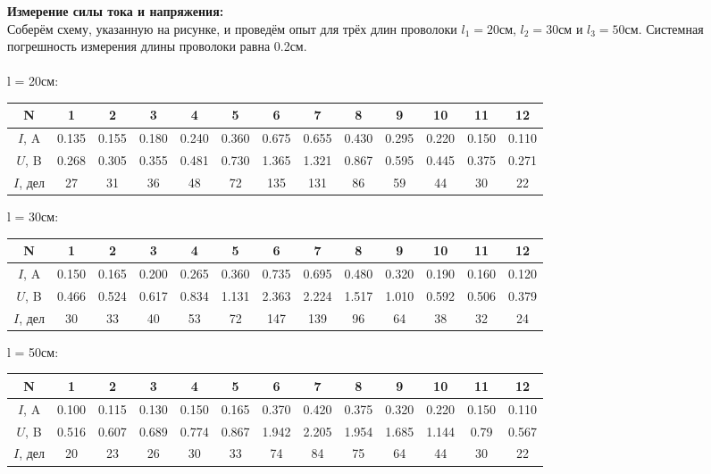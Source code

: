 \documentclass[12pt, a4paper]{article}
\begin{document}
    \textbf{Измерение силы тока и напряжения:} \\
    Соберём схему, указанную на рисунке, и проведём опыт для трёх длин проволоки $l_1 = 20$см, $l_2 = 30$см и $l_3 = 50$см. Системная погрешность измерения длины проволоки равна 0.2см. \\
    \\ l = 20см:
    \begin{center}
        \begin{tabular}{ |c|c|c|c|c|c|c|c|c|c|c|c|c| } \hline
            N & 1 & 2 & 3 & 4 & 5 & 6 & 7 & 8 & 9 & 10 & 11 & 12 \\ \hline
            $I$, A & 0.135 & 0.155 & 0.180 & 0.240 & 0.360 & 0.675 & 0.655 & 0.430 & 0.295 & 0.220 & 0.150 & 0.110 \\ \hline
            $U$, B & 0.268 & 0.305 & 0.355 & 0.481 & 0.730 & 1.365 & 1.321 & 0.867 & 0.595 & 0.445 & 0.375 & 0.271 \\ \hline
            $I$, дел & 27 & 31 & 36 & 48 & 72 & 135 & 131 & 86 & 59 & 44 & 30 & 22 \\ \hline
        \end{tabular}
        \end{center}
    l = 30см:
    \begin{center}
        \begin{tabular}{ |c|c|c|c|c|c|c|c|c|c|c|c|c| } \hline
            N & 1 & 2 & 3 & 4 & 5 & 6 & 7 & 8 & 9 & 10 & 11 & 12 \\ \hline
            $I$, A & 0.150 & 0.165 & 0.200 & 0.265 & 0.360 & 0.735 & 0.695 & 0.480 & 0.320 & 0.190 & 0.160 & 0.120 \\ \hline
            $U$, B & 0.466 & 0.524 & 0.617 & 0.834 & 1.131 & 2.363 & 2.224 & 1.517 & 1.010 & 0.592 & 0.506 & 0.379 \\ \hline
            $I$, дел & 30 & 33 & 40 & 53 & 72 & 147 & 139 & 96 & 64 & 38 & 32 & 24 \\ \hline
        \end{tabular}
        \end{center}
    l = 50см:
    \begin{center}
        \begin{tabular}{ |c|c|c|c|c|c|c|c|c|c|c|c|c| } \hline
            N & 1 & 2 & 3 & 4 & 5 & 6 & 7 & 8 & 9 & 10 & 11 & 12 \\ \hline
            $I$, A & 0.100 & 0.115 & 0.130 & 0.150 & 0.165 & 0.370 & 0.420 & 0.375 & 0.320 & 0.220 & 0.150 & 0.110 \\ \hline
            $U$, B & 0.516 & 0.607 & 0.689 & 0.774 & 0.867 & 1.942 & 2.205 & 1.954 & 1.685 & 1.144 & 0.79 & 0.567 \\ \hline
            $I$, дел & 20 & 23 & 26 & 30 & 33 & 74 & 84 & 75 & 64 & 44 & 30 & 22 \\ \hline
        \end{tabular}
        \end{center}
\end{document}
